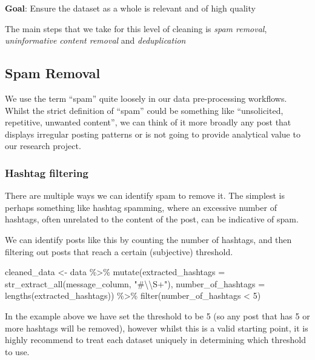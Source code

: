 \documentclass[
  letterpaper,
  DIV=11,
  numbers=noendperiod]{scrreprt}
\newenvironment{Shaded}{\begin{snugshade}}{\end{snugshade}}
\newcommand{\AttributeTok}[1]{\textcolor[rgb]{0.40,0.45,0.13}{#1}}
\newcommand{\DecValTok}[1]{\textcolor[rgb]{0.68,0.00,0.00}{#1}}
\newcommand{\FunctionTok}[1]{\textcolor[rgb]{0.28,0.35,0.67}{#1}}
\newcommand{\NormalTok}[1]{\textcolor[rgb]{0.00,0.23,0.31}{#1}}
\newcommand{\OtherTok}[1]{\textcolor[rgb]{0.00,0.23,0.31}{#1}}
\newcommand{\SpecialCharTok}[1]{\textcolor[rgb]{0.37,0.37,0.37}{#1}}
\newcommand{\StringTok}[1]{\textcolor[rgb]{0.13,0.47,0.30}{#1}}
\begin{document}
\textbf{Goal}: Ensure the dataset as a whole is relevant and of high
quality

The main steps that we take for this level of cleaning is \emph{spam
removal}, \emph{uninformative content removal} and \emph{deduplication}

\subsection{Spam Removal}\label{spam-removal}

We use the term ``spam'' quite loosely in our data pre-processing
workflows. Whilst the strict definition of ``spam'' could be something
like ``unsolicited, repetitive, unwanted content'', we can think of it
more broadly any post that displays irregular posting patterns or is not
going to provide analytical value to our research project.

\subsubsection{Hashtag filtering}\label{hashtag-filtering}

There are multiple ways we can identify spam to remove it. The simplest
is perhaps something like hashtag spamming, where an excessive number of
hashtags, often unrelated to the content of the post, can be indicative
of spam.

We can identify posts like this by counting the number of hashtags, and
then filtering out posts that reach a certain (subjective) threshold.

\begin{Shaded}
\begin{Highlighting}[]
\NormalTok{cleaned\_data }\OtherTok{\textless{}{-}}\NormalTok{ data }\SpecialCharTok{\%\textgreater{}\%} 
  \FunctionTok{mutate}\NormalTok{(}\AttributeTok{extracted\_hashtags =} \FunctionTok{str\_extract\_all}\NormalTok{(message\_column, }\StringTok{"\#}\SpecialCharTok{\textbackslash{}\textbackslash{}}\StringTok{S+"}\NormalTok{),}
         \AttributeTok{number\_of\_hashtags =} \FunctionTok{lengths}\NormalTok{(extracted\_hashtags)) }\SpecialCharTok{\%\textgreater{}\%} 
  \FunctionTok{filter}\NormalTok{(number\_of\_hashtags }\SpecialCharTok{\textless{}} \DecValTok{5}\NormalTok{)}
\end{Highlighting}
\end{Shaded}

In the example above we have set the threshold to be 5 (so any post that
has 5 or more hashtags will be removed), however whilst this is a valid
starting point, it is highly recommend to treat each dataset uniquely in
determining which threshold to use.
\end{document}
